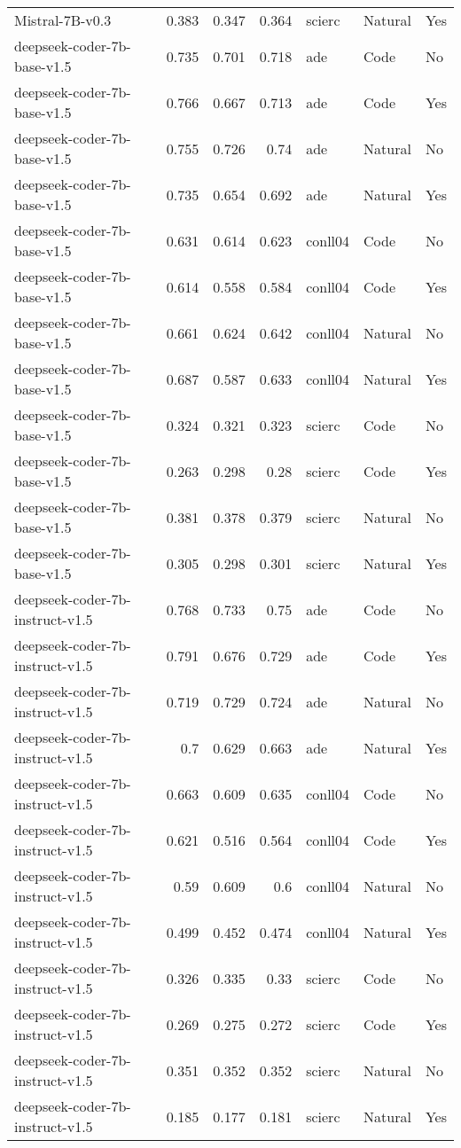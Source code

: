 \begin{tabular}{lrrrlll}
Mistral-7B-v0.3 & 0.383 & 0.347 & 0.364 & scierc & Natural & Yes \\
deepseek-coder-7b-base-v1.5 & 0.735 & 0.701 & 0.718 & ade & Code & No \\
deepseek-coder-7b-base-v1.5 & 0.766 & 0.667 & 0.713 & ade & Code & Yes \\
deepseek-coder-7b-base-v1.5 & 0.755 & 0.726 & 0.74 & ade & Natural & No \\
deepseek-coder-7b-base-v1.5 & 0.735 & 0.654 & 0.692 & ade & Natural & Yes \\
deepseek-coder-7b-base-v1.5 & 0.631 & 0.614 & 0.623 & conll04 & Code & No \\
deepseek-coder-7b-base-v1.5 & 0.614 & 0.558 & 0.584 & conll04 & Code & Yes \\
deepseek-coder-7b-base-v1.5 & 0.661 & 0.624 & 0.642 & conll04 & Natural & No \\
deepseek-coder-7b-base-v1.5 & 0.687 & 0.587 & 0.633 & conll04 & Natural & Yes \\
deepseek-coder-7b-base-v1.5 & 0.324 & 0.321 & 0.323 & scierc & Code & No \\
deepseek-coder-7b-base-v1.5 & 0.263 & 0.298 & 0.28 & scierc & Code & Yes \\
deepseek-coder-7b-base-v1.5 & 0.381 & 0.378 & 0.379 & scierc & Natural & No \\
deepseek-coder-7b-base-v1.5 & 0.305 & 0.298 & 0.301 & scierc & Natural & Yes \\
deepseek-coder-7b-instruct-v1.5 & 0.768 & 0.733 & 0.75 & ade & Code & No \\
deepseek-coder-7b-instruct-v1.5 & 0.791 & 0.676 & 0.729 & ade & Code & Yes \\
deepseek-coder-7b-instruct-v1.5 & 0.719 & 0.729 & 0.724 & ade & Natural & No \\
deepseek-coder-7b-instruct-v1.5 & 0.7 & 0.629 & 0.663 & ade & Natural & Yes \\
deepseek-coder-7b-instruct-v1.5 & 0.663 & 0.609 & 0.635 & conll04 & Code & No \\
deepseek-coder-7b-instruct-v1.5 & 0.621 & 0.516 & 0.564 & conll04 & Code & Yes \\
deepseek-coder-7b-instruct-v1.5 & 0.59 & 0.609 & 0.6 & conll04 & Natural & No \\
deepseek-coder-7b-instruct-v1.5 & 0.499 & 0.452 & 0.474 & conll04 & Natural & Yes \\
deepseek-coder-7b-instruct-v1.5 & 0.326 & 0.335 & 0.33 & scierc & Code & No \\
deepseek-coder-7b-instruct-v1.5 & 0.269 & 0.275 & 0.272 & scierc & Code & Yes \\
deepseek-coder-7b-instruct-v1.5 & 0.351 & 0.352 & 0.352 & scierc & Natural & No \\
deepseek-coder-7b-instruct-v1.5 & 0.185 & 0.177 & 0.181 & scierc & Natural & Yes \\
\bottomrule
\end{tabular}

